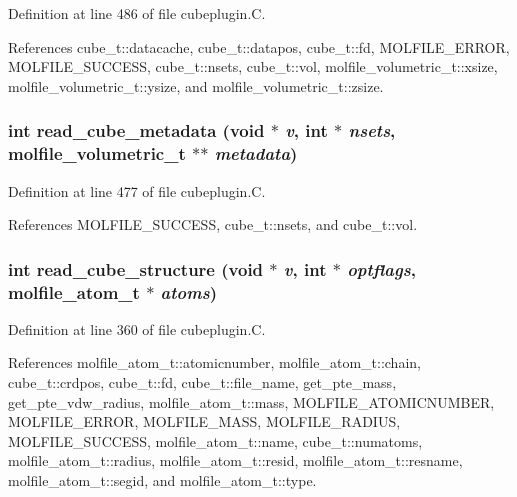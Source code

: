 Definition at line 486 of file cubeplugin.C.

References cube\_\-t::datacache, cube\_\-t::datapos, cube\_\-t::fd, MOLFILE\_\-ERROR, MOLFILE\_\-SUCCESS, cube\_\-t::nsets, cube\_\-t::vol, molfile\_\-volumetric\_\-t::xsize, molfile\_\-volumetric\_\-t::ysize, and molfile\_\-volumetric\_\-t::zsize.
\subsubsection{\setlength{\rightskip}{0pt plus 5cm}int read\_\-cube\_\-metadata (void $\ast$ {\em v}, int $\ast$ {\em nsets}, {\bf molfile\_\-volumetric\_\-t} $\ast$$\ast$ {\em metadata})\hspace{0.3cm}{\tt  [static]}}\label{cubeplugin_8C_a10}




Definition at line 477 of file cubeplugin.C.

References MOLFILE\_\-SUCCESS, cube\_\-t::nsets, and cube\_\-t::vol.
\subsubsection{\setlength{\rightskip}{0pt plus 5cm}int read\_\-cube\_\-structure (void $\ast$ {\em v}, int $\ast$ {\em optflags}, {\bf molfile\_\-atom\_\-t} $\ast$ {\em atoms})\hspace{0.3cm}{\tt  [static]}}\label{cubeplugin_8C_a8}




Definition at line 360 of file cubeplugin.C.

References molfile\_\-atom\_\-t::atomicnumber, molfile\_\-atom\_\-t::chain, cube\_\-t::crdpos, cube\_\-t::fd, cube\_\-t::file\_\-name, get\_\-pte\_\-mass, get\_\-pte\_\-vdw\_\-radius, molfile\_\-atom\_\-t::mass, MOLFILE\_\-ATOMICNUMBER, MOLFILE\_\-ERROR, MOLFILE\_\-MASS, MOLFILE\_\-RADIUS, MOLFILE\_\-SUCCESS, molfile\_\-atom\_\-t::name, cube\_\-t::numatoms, molfile\_\-atom\_\-t::radius, molfile\_\-atom\_\-t::resid, molfile\_\-atom\_\-t::resname, molfile\_\-atom\_\-t::segid, and molfile\_\-atom\_\-t::type.
